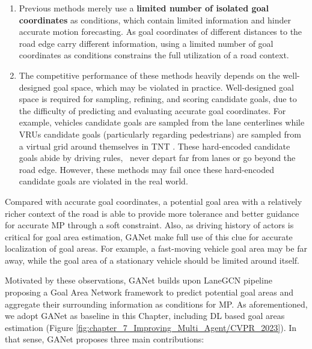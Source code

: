 \begin{enumerate}
	
	\item Previous methods merely use a \textbf{limited number of isolated goal coordinates} as conditions, which contain limited information and hinder accurate motion forecasting. As goal coordinates of different distances to the road edge carry different information, using a limited number of goal coordinates as conditions constrains the full utilization of a road context.
	
	\item The competitive performance of these methods heavily depends on the well-designed goal space, which may be violated in practice. Well-designed goal space is required for sampling, refining, and scoring candidate goals, due to the difficulty of predicting and evaluating accurate goal coordinates. For example, vehicles candidate goals are sampled from the lane centerlines while \acp{VRU} candidate goals (particularly regarding pedestrians) are sampled from a virtual grid around themselves in TNT \cite{zhao2021tnt}. These hard-encoded candidate goals abide by driving rules, \eg \ never depart far from lanes or go beyond the road edge. However, these methods may fail once these hard-encoded candidate goals are violated in the real world. 
	
\end{enumerate}

Compared with accurate goal coordinates, a potential goal area with a relatively richer context of the road is able to provide more tolerance and better guidance for accurate \ac{MP} through a soft constraint. Also, as driving history of actors is critical for goal area estimation, GANet \cite{wang2022ganet} make full use of this clue for accurate localization of goal areas. For example, a fast-moving vehicle goal area may be far away, while the goal area of a stationary vehicle should be limited around itself.

Motivated by these observations, GANet builds upon LaneGCN pipeline proposing a Goal Area Network framework to predict potential goal areas and aggregate their surrounding information as conditions for \ac{MP}. As aforementioned, we adopt GANet as baseline in this Chapter, including \ac{DL} based goal areas estimation (Figure \ref{fig:chapter_7_Improving_Multi_Agent/CVPR_2023}). In that sense, GANet \cite{wang2022ganet} proposes three main contributions:

